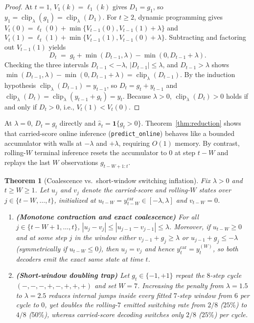 \documentclass[11pt]{article}
\newtheorem{theorem}{Theorem}
\newcommand{\clip}{\operatorname{clip}}
\newcommand{\ind}{\mathbf{1}}
\begin{document}
\begin{proof}
At $t = 1$, $V_1(k) = \ell_1(k)$ gives $D_1 = g_1$, so $y_1 = \clip_\lambda(g_1) = \clip_\lambda(D_1)$. For $t \ge 2$, dynamic programming gives $V_t(0) = \ell_t(0) + \min\{V_{t-1}(0), V_{t-1}(1) + \lambda\}$ and $V_t(1) = \ell_t(1) + \min\{V_{t-1}(1), V_{t-1}(0) + \lambda\}$. Subtracting and factoring out $V_{t-1}(1)$ yields
\begin{equation}
  D_t \;=\; g_t + \min(D_{t-1}, \lambda) - \min(0, D_{t-1} + \lambda).
  \label{eq:costdiff}
\end{equation}
Checking the three intervals $D_{t-1} < -\lambda$, $|D_{t-1}| \le \lambda$, and $D_{t-1} > \lambda$ shows $\min(D_{t-1}, \lambda) - \min(0, D_{t-1} + \lambda) = \clip_\lambda(D_{t-1})$. By the induction hypothesis $\clip_\lambda(D_{t-1}) = y_{t-1}$, so $D_t = g_t + y_{t-1}$ and $\clip_\lambda(D_t) = \clip_\lambda(y_{t-1} + g_t) = y_t$. Because $\lambda > 0$, $\clip_\lambda(D_t) > 0$ holds if and only if $D_t > 0$, i.e., $V_t(1) < V_t(0)$.
\end{proof}

At $\lambda = 0$, $D_t = g_t$ directly and $\hat{s}_t = \ind\{g_t > 0\}$. Theorem~\ref{thm:reduction} shows that carried-score online inference (\texttt{predict\_online}) behaves like a bounded accumulator with walls at $-\lambda$ and $+\lambda$, requiring $O(1)$ memory. By contrast, rolling-$W$ terminal inference resets the accumulator to $0$ at step $t - W$ and replays the last $W$ observations $g_{t-W+1:t}$.

\begin{theorem}[Coalescence vs.\ short-window switching inflation]
\label{thm:coalescence}
Fix $\lambda > 0$ and $t \ge W \ge 1$. Let $u_j$ and $v_j$ denote the carried-score and rolling-$W$ states over $j \in \{t-W, \dots, t\}$, initialized at $u_{t-W} = y_{t-W}^{\mathrm{car}} \in [-\lambda, \lambda]$ and $v_{t-W} = 0$.
\begin{enumerate}
  \item \textbf{(Monotone contraction and exact coalescence)} For all $j \in \{t-W+1, \dots, t\}$, $|u_j - v_j| \le |u_{j-1} - v_{j-1}| \le \lambda$. Moreover, if $u_{t-W} \ge 0$ and at some step $j$ in the window either $v_{j-1} + g_j \ge \lambda$ or $u_{j-1} + g_j \le -\lambda$ (symmetrically if $u_{t-W} \le 0$), then $u_j = v_j$ and hence $y_t^{\mathrm{car}} = y_t^{(W)}$, so both decoders emit the exact same state at time $t$.
  \item \textbf{(Short-window doubling trap)} Let $g_t \in \{-1, +1\}$ repeat the $8$-step cycle $(-,-,-,+,\allowbreak -,+,+,+)$ and set $W = 7$. Increasing the penalty from $\lambda = 1.5$ to $\lambda = 2.5$ reduces internal jumps inside every fitted $7$-step window from $6$ per cycle to $0$, yet \emph{doubles} the rolling-$7$ emitted switching rate from $2/8$ ($25\%$) to $4/8$ ($50\%$), whereas carried-score decoding switches only $2/8$ ($25\%$) per cycle.
\end{enumerate}
\end{theorem}
\end{document}

